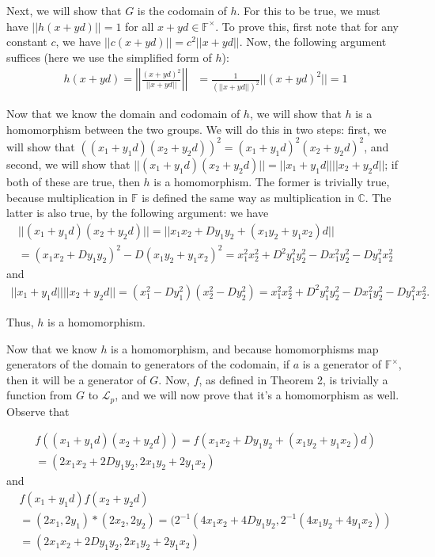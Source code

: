 \documentclass{article}
\begin{document}
Next, we will show that $G$ is the codomain of $h$. For this to be true, we must have $\lvert \lvert h(x+yd) \rvert \rvert = 1$ for all $x+yd \in \mathbb{F}^\times$. To prove this, first note that for any constant $c$, we have $\lvert \lvert c(x+yd) \rvert \rvert = c^2 \lvert \lvert x+yd \rvert \rvert$. Now, the following argument suffices (here we use the simplified form of $h$): 
\begin{align*}
	h(x+yd) = \left \lvert \left \lvert \frac{(x+yd)^2}{\lvert \lvert x+yd \rvert \rvert} \right \rvert \right \rvert &= \frac{1}{(\lvert \lvert x+yd \rvert \rvert)^2} \lvert \lvert (x+yd)^2 \rvert \rvert = 1
\end{align*}

Now that we know the domain and codomain of $h$, we will show that $h$ is a homomorphism between the two groups. We will do this in two steps: first, we will show that $((x_1+y_1d)(x_2+y_2d))^2 = (x_1+y_1d)^2(x_2+y_2d)^2$, and second, we will show that $\lvert \lvert (x_1+y_1d)(x_2+y_2d) \rvert \rvert = \lvert \lvert x_1+y_1d \rvert \rvert \lvert \lvert x_2+y_2d \rvert \rvert$; if both of these are true, then $h$ is a homomorphism. The former is trivially true, because multiplication in $\mathbb{F}$ is defined the same way as multiplication in $\mathbb{C}$. The latter is also true, by the following argument: we have 
\begin{gather*}
	\lvert \lvert (x_1+y_1d)(x_2+y_2d) \rvert \rvert = \lvert \lvert x_1x_2 + Dy_1y_2 + (x_1y_2 + y_1x_2)d \rvert \rvert \\
	= (x_1x_2 + Dy_1y_2)^2 - D(x_1y_2 + y_1x_2)^2 = x_1^2x_2^2 + D^2y_1^2y_2^2 - Dx_1^2y_2^2 - Dy_1^2x_2^2
\end{gather*} 
and 
\begin{gather*}
	\lvert \lvert x_1+y_1d \rvert \rvert \lvert \lvert x_2+y_2d \rvert \rvert = (x_1^2 - Dy_1^2)(x_2^2 - Dy_2^2) = x_1^2x_2^2 + D^2y_1^2y_2^2 - Dx_1^2y_2^2 - Dy_1^2x_2^2.
\end{gather*}

\noindent Thus, $h$ is a homomorphism.

Now that we know $h$ is a homomorphism, and because homomorphisms map generators of the domain to generators of the codomain, if $a$ is a generator of $\mathbb{F}^\times$, then it will be a generator of $G$. Now, $f$, as defined in Theorem 2, is trivially a function from $G$ to $\mathcal{L}_p$, and we will now prove that it's a homomorphism as well. Observe that 

\begin{gather*}
f((x_1+y_1d)(x_2+y_2d)) = f(x_1x_2 + Dy_1y_2 + (x_1y_2 + y_1x_2)d) \\
= (2x_1x_2 + 2Dy_1y_2, 2x_1y_2 + 2y_1x_2)
\end{gather*}
and
\begin{gather*}
f(x_1 + y_1d)f(x_2 + y_2d) \\
= (2x_1,2y_1)*(2x_2,2y_2) = (2^{-1}(4x_1x_2 + 4Dy_1y_2, 2^{-1}(4x_1y_2 + 4y_1x_2)) \\
= (2x_1x_2 + 2Dy_1y_2, 2x_1y_2 + 2y_1x_2)
\end{gather*}
\end{document}
